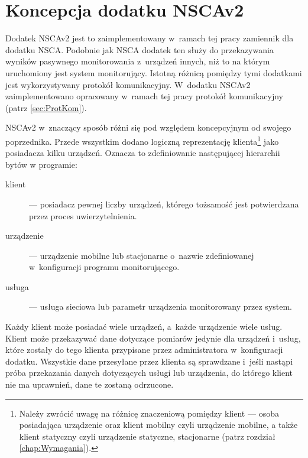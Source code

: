 \section[Koncepcja dodatku NSCAv2][Koncepcja dodatku NSCAv2]{Koncepcja
  dodatku NSCAv2}
\label{sec:ProjModOdb}

Dodatek NSCAv2 jest to zaimplementowany w~ramach tej pracy zamiennik
dla dodatku NSCA. Podobnie jak NSCA dodatek ten służy do przekazywania
wyników pasywnego monitorowania z~urządzeń innych, niż to na którym
uruchomiony jest system monitorujący. Istotną różnicą pomiędzy tymi
dodatkami jest wykorzystywany protokół komunikacyjny. W~dodatku NSCAv2
zaimplementowano opracowany w~ramach tej pracy protokół komunikacyjny
(patrz \ref{sec:ProtKom}).

NSCAv2 w~znaczący sposób różni się pod względem koncepcyjnym od
swojego poprzednika. Przede wszystkim dodano logiczną reprezentację
klienta\footnote{Należy zwrócić uwagę na różnicę znaczeniową pomiędzy
  klient --- osoba posiadająca urządzenie oraz klient mobilny
  czyli urządzenie mobilne, a także klient statyczny czyli
  urządzenie statyczne, stacjonarne (patrz rozdział
  \ref{chap:Wymagania}).} jako posiadacza kilku urządzeń. Oznacza to
zdefiniowanie następującej hierarchii bytów w programie:

\begin{description}
\item[klient] --- posiadacz pewnej liczby urządzeń, którego tożsamość
  jest potwierdzana przez proces uwierzytelnienia.
\item[urządzenie] --- urządzenie mobilne lub stacjonarne o~nazwie
  zdefiniowanej w~konfiguracji programu monitorującego.
\item[usługa] --- usługa sieciowa lub parametr urządzenia monitorowany
  przez system.
\end{description}

Każdy klient może posiadać wiele urządzeń, a~każde urządzenie wiele
usług. Klient może przekazywać dane dotyczące pomiarów jedynie dla
urządzeń i~usług, które zostały do tego klienta przypisane przez
administratora w~konfiguracji dodatku. Wszystkie dane przesyłane przez
klienta są sprawdzane i~jeśli nastąpi próba przekazania danych
dotyczących usługi lub urządzenia, do którego klient nie ma uprawnień,
dane te zostaną odrzucone.


